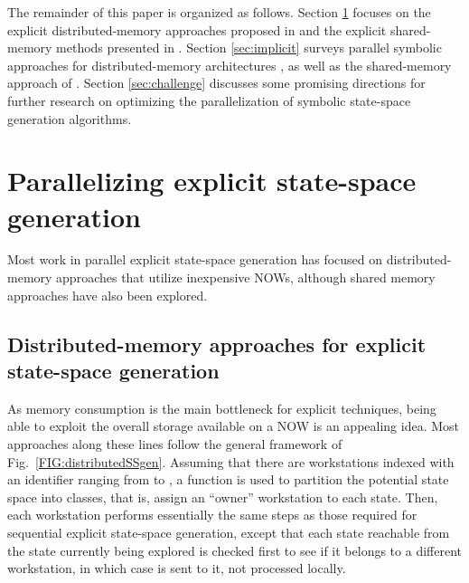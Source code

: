 \documentclass[copyright,creativecommons]{eptcs}
\begin{document}
The remainder of this paper is organized as follows.
Section \ref{sec:explicit} focuses on the explicit distributed-memory
approaches proposed in \cite{BarnatASE03,BarnatBR05,Lerda99,Stern97murphi}
and the explicit shared-memory methods presented
in \cite{BarnatBR07,Barnat2008Divine,Inggs2002}.
Section \ref{sec:implicit} surveys parallel symbolic approaches
for distributed-memory architectures
\cite{Arunachalam1996,2004QEST-Distributed,2005PDMC-FirePredict,
Grumberg2005AsynPDSSGEN,Grumberg2003workefficient,Heymann2002fmsd,
Kimura1990,Stornetta1995,Stornetta1996,Yang1997},
as well as the shared-memory approach of \cite{2007CAV-Cilk}.
Section \ref{sec:challenge} discusses some promising directions for further
research on optimizing the parallelization of symbolic state-space
generation algorithms.







\section{Parallelizing explicit state-space generation}
\label{sec:explicit}

Most work in parallel explicit state-space generation has focused on
distributed-memory approaches that utilize inexpensive NOWs, although
shared memory approaches have also been explored.

\subsection{Distributed-memory approaches for explicit state-space generation}
\label{sec:Exp_Distributed}
As memory consumption is the main bottleneck for explicit techniques,
being able to exploit the overall storage available on a NOW is an appealing
idea.
Most approaches along these lines follow the general framework
of Fig.~\ref{FIG:distributedSSgen}.
Assuming that there are  workstations
indexed with an identifier  ranging from  to ,
a function  is used to partition
the potential state space  into  classes, that is, assign
an ``owner'' workstation to each state.
Then, each workstation performs essentially the same steps as those
required for sequential explicit state-space generation, except that each
state  reachable from the state  currently being explored
is checked first to see if it belongs to a different workstation,
in which case  is sent to it, not processed locally.
\end{document}
